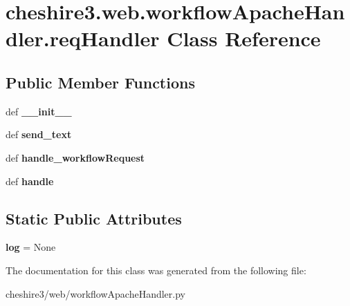 \hypertarget{classcheshire3_1_1web_1_1workflow_apache_handler_1_1req_handler}{\section{cheshire3.\-web.\-workflow\-Apache\-Handler.\-req\-Handler Class Reference}
\label{classcheshire3_1_1web_1_1workflow_apache_handler_1_1req_handler}
}
\subsection*{Public Member Functions}
\begin{DoxyCompactItemize}
\item 
\hypertarget{classcheshire3_1_1web_1_1workflow_apache_handler_1_1req_handler_a4e32718ad59331f5ca0ec4c64a27d359}{def {\bfseries \-\_\-\-\_\-init\-\_\-\-\_\-}}\label{classcheshire3_1_1web_1_1workflow_apache_handler_1_1req_handler_a4e32718ad59331f5ca0ec4c64a27d359}

\item 
\hypertarget{classcheshire3_1_1web_1_1workflow_apache_handler_1_1req_handler_aeab91c5b274478091bd29c48e1028786}{def {\bfseries send\-\_\-text}}\label{classcheshire3_1_1web_1_1workflow_apache_handler_1_1req_handler_aeab91c5b274478091bd29c48e1028786}

\item 
\hypertarget{classcheshire3_1_1web_1_1workflow_apache_handler_1_1req_handler_ae9b77d1377fb53f6e957ff6cdbdb7c89}{def {\bfseries handle\-\_\-workflow\-Request}}\label{classcheshire3_1_1web_1_1workflow_apache_handler_1_1req_handler_ae9b77d1377fb53f6e957ff6cdbdb7c89}

\item 
\hypertarget{classcheshire3_1_1web_1_1workflow_apache_handler_1_1req_handler_a4b4987b3687aadb0c99eceab5b2a13bf}{def {\bfseries handle}}\label{classcheshire3_1_1web_1_1workflow_apache_handler_1_1req_handler_a4b4987b3687aadb0c99eceab5b2a13bf}

\end{DoxyCompactItemize}
\subsection*{Static Public Attributes}
\begin{DoxyCompactItemize}
\item 
\hypertarget{classcheshire3_1_1web_1_1workflow_apache_handler_1_1req_handler_a37b432a2d32cc9a84a8f1b40177efde7}{{\bfseries log} = None}\label{classcheshire3_1_1web_1_1workflow_apache_handler_1_1req_handler_a37b432a2d32cc9a84a8f1b40177efde7}

\end{DoxyCompactItemize}


The documentation for this class was generated from the following file\-:\begin{DoxyCompactItemize}
\item 
cheshire3/web/workflow\-Apache\-Handler.\-py\end{DoxyCompactItemize}

